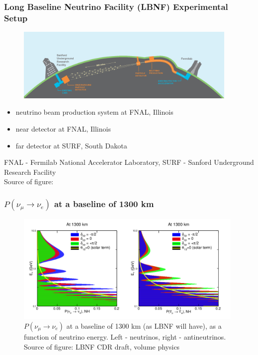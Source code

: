 \begin{frame}\frametitle{Long Baseline Neutrino Facility (LBNF) Experimental Setup}
\scriptsize
\begin{figure}
\label{fig:LBNF_overallScheme}
\centering
\includegraphics[width=0.95\textwidth, keepaspectratio=true]{figs/LBNF_overallScheme.png} 
\end{figure}
\begin{itemize}
  \item neutrino beam production system at FNAL, Illinois 
  \item near detector at FNAL, Illinois 
  \item far detector at SURF, South Dakota
\end{itemize}
\tiny
FNAL - Fermilab National Accelerator Laboratory, SURF - Sanford Underground Research Facility\\
Source of figure: \cite{ref_LBNFweb} 
\end{frame}

\begin{frame}\frametitle{$P(\nu_\mu \rightarrow \nu_e)$ at a baseline of 1300 km}
  \scriptsize
  \begin{figure}
  \label{fig:LBNF_oscProbability}
  \centering
  \includegraphics[width=0.98\textwidth, keepaspectratio=true]{figs/LBNF_oscProbability.png}
  \\$P(\nu_\mu \rightarrow \nu_e)$ at a baseline of 1300 km (as LBNF will have), as a function of neutrino energy. Left - neutrinos, right - antineutrinos. Source of figure: LBNF CDR draft, volume physics \cite{ref_LBNFdoc_volume-physics}
  \end{figure}
\end{frame}

